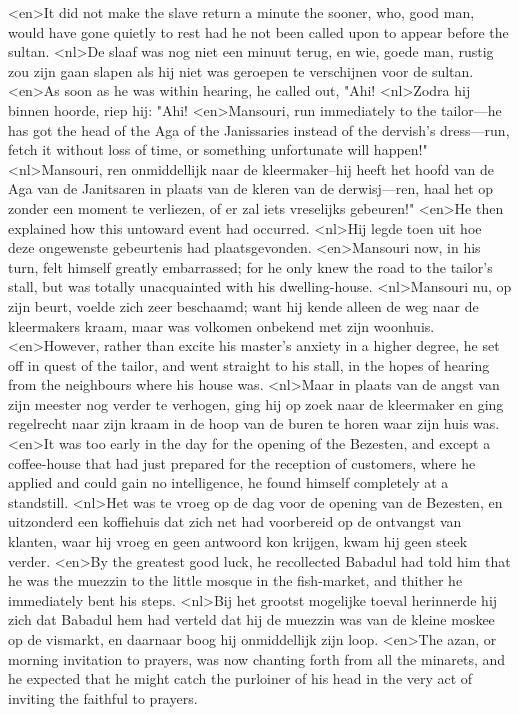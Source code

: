 <en>It did not make the slave return a minute the sooner, who, good man, would have gone quietly to rest had he not been called upon to appear before the sultan.
<nl>De slaaf was nog niet een minuut terug, en wie, goede man, rustig zou zijn gaan slapen als hij niet was geroepen te verschijnen   voor de sultan.
<en>As soon as he was within hearing, he called out, "Ahi!
<nl>Zodra hij binnen hoorde, riep hij: "Ahi!
<en>Mansouri, run immediately to the tailor—he has got the head of the Aga of the Janissaries instead of the dervish's dress---run, fetch it without loss of time, or something unfortunate will happen!"
<nl>Mansouri, ren onmiddellijk naar de kleermaker--hij heeft het hoofd van de Aga van de Janitsaren in plaats van de kleren van de derwisj---ren, haal het op zonder een moment te verliezen, of er zal iets vreselijks gebeuren!"
<en>He then explained how this untoward event had occurred.
<nl>Hij legde toen uit hoe deze ongewenste gebeurtenis had plaatsgevonden.
<en>Mansouri now, in his turn, felt himself greatly embarrassed; for he only knew the road to the tailor's stall, but was totally unacquainted with his dwelling-house.
<nl>Mansouri nu, op zijn beurt, voelde zich zeer beschaamd; want hij kende alleen de weg naar de kleermakers kraam, maar was volkomen onbekend met zijn woonhuis.
<en>However, rather than excite his master's anxiety in a higher degree, he set off in quest of the tailor, and went straight to his stall, in the hopes of hearing from the neighbours where his house was.
<nl>Maar in plaats van de angst van zijn meester nog verder te verhogen, ging hij op zoek naar de kleermaker en ging regelrecht naar zijn kraam in de hoop van de buren te horen  waar zijn huis was.
<en>It was too early in the day for the opening of the Bezesten, and except a coffee-house that had just prepared for the reception of customers, where he applied and could gain no intelligence, he found himself completely at a standstill.
<nl>Het was te vroeg op de dag voor de opening van de Bezesten, en uitzonderd een koffiehuis dat zich net had voorbereid op  de ontvangst van klanten, waar hij vroeg en  geen antwoord kon krijgen, kwam hij geen steek verder.
<en>By the greatest good luck, he recollected Babadul had told him that he was the muezzin to the little mosque in the fish-market, and thither he immediately bent his steps.
<nl>Bij  het grootst mogelijke toeval herinnerde hij zich dat Babadul hem had verteld dat hij de muezzin was van de kleine moskee op de vismarkt, en daarnaar boog hij onmiddellijk zijn loop.
<en>The azan, or morning invitation to prayers, was now chanting forth from all the minarets, and he expected that he might catch the purloiner of his head in the very act of inviting the faithful to prayers.

